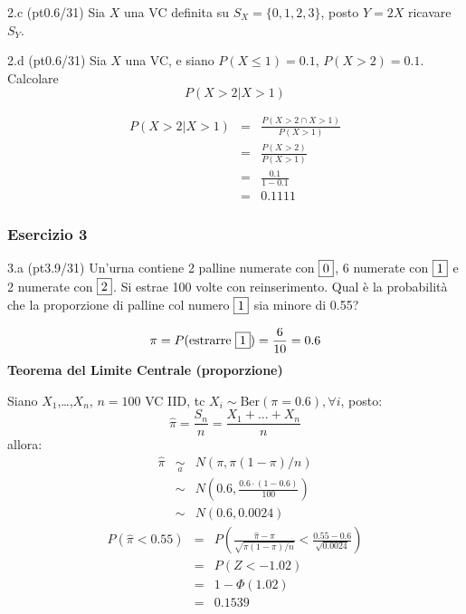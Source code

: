 \documentclass[
  10pt,
]{article}
\begin{document}
2.c (pt\hspace{.1em}0.6/31) Sia \(X\) una VC definita su \(S_X=\{0,1,2,3\}\), posto \(Y=2X\) ricavare \(S_Y\).

2.d (pt\hspace{.1em}0.6/31) Sia \(X\) una VC, e siano \(P(X\leq 1)=0.1\), \(P(X> 2)=0.1\). Calcolare
\[
P(X>2|X>1)
\]

\begin{sol}
\begin{eqnarray}
  P(X>2|X>1) &=&  \frac{P({X>2}\cap {X>1})}{P(X> 1)}\\
             &=&  \frac{P({X>2})}{P(X> 1)}\\
             &=&   \frac{0.1}{1-0.1}\\
             &=& 0.1111
\end{eqnarray}

\end{sol}

\subsubsection{Esercizio 3}\label{esercizio-3}

3.a (pt\hspace{.1em}3.9/31) Un'urna contiene 2 palline numerate con \(\fbox{0}\), 6 numerate con \(\fbox{1}\) e 2 numerate con \(\fbox{2}\). Si estrae 100 volte con reinserimento. Qual è la probabilità che la proporzione di palline col numero \(\fbox{1}\) sia minore di 0.55?

\begin{sol}
\[
\pi = P(\text{estrarre $\fbox{1}$})=\frac {6}{10}=0.6
\]
\textbf{Teorema del Limite Centrale (proporzione)}

Siano \(X_1\),\ldots,\(X_n\), \(n=100\) VC IID, tc \(X_i\sim\text{Ber}(\pi=0.6)\)\(,\forall i\), posto:
\[
      \hat\pi=\frac{S_n}n = \frac{X_1 + ... + X_n}n
      \]
allora:\begin{eqnarray*}
  \hat\pi & \mathop{\sim}\limits_{a}& N(\pi,\pi(1-\pi)/n) \\
  &\sim & N\left(0.6,\frac{0.6\cdot(1-0.6)}{100}\right) \\
     &\sim & N(0.6,0.0024) 
  \end{eqnarray*}\begin{eqnarray*}
      P( \hat\pi   <   0.55 ) 
        &=& P\left(  \frac { \hat\pi  -  \pi }{ \sqrt{\pi(1-\pi)/n} }  <  \frac { 0.55  -  0.6 }{\sqrt{ 0.0024 }} \right)  \\
                 &=& P\left(  Z   <   -1.02 \right) \\    
                 &=&  1-\Phi( 1.02 ) \\ &=&  0.1539 
      \end{eqnarray*}

\end{sol}
\end{document}
